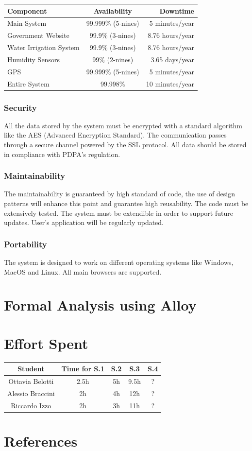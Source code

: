 \documentclass[table, 12pt]{article}
\begin{document}
\begin{table}[H]
    \begin{center}
      \label{tab:availability}
      \begin{tabular}{l|c|r}
        \textbf{Component} & \textbf{Availability} & \textbf{Downtime}\\
        \hline
        Main System & 99.999\% (5-nines) & 5 minutes/year\\
        Government Website & 99.9\% (3-nines) & 8.76 hours/year\\
        Water Irrigation System & 99.9\% (3-nines) & 8.76 hours/year\\
        Humidity Sensors & 99\% (2-nines) & 3.65 days/year\\
        GPS & 99.999\% (5-nines) & 5 minutes/year\\
        \hline
        Entire System & 99.998\% & 10 minutes/year
      \end{tabular}
    \end{center}
\end{table}

\subsubsection{Security}
All the data stored by the system must be encrypted with a standard algorithm like the AES (Advanced Encryption Standard).
The communication passes through a secure channel powered by the SSL protocol.
All data should be stored in compliance with PDPA's regulation.
\subsubsection{Maintainability}
The maintainability is guaranteed by high standard of code, the use of design patterns will enhance this point and guarantee high reusability.
The code must be extensively tested.
The system must be extendible in order to support future updates.
User's application will be regularly updated.
\subsubsection{Portability}
The system is designed to work on different operating systems like Windows, MacOS and Linux.
All main browsers are supported.
\newpage
\section{Formal Analysis using Alloy}
\section{Effort Spent}
    \begin{tabular}{| c || c | c| c| c |}
        \hline
        Student & Time for S.1 & S.2 & S.3 & S.4 \\ \hline
        Ottavia Belotti & 2.5h & 5h & 9.5h & ? \\
        Alessio Braccini & 2h & 4h & 12h & ? \\
        Riccardo Izzo & 2h & 3h & 11h & ? \\
        \hline
    \end{tabular}

\section{References}
\end{document}
